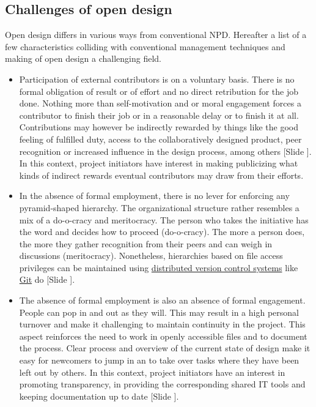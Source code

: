 \documentclass{article}
\newcounter{slide}
\begin{document}
\subsection{Challenges of open design}
\label{sec:challengesOD}
Open design differs in various ways from conventional NPD. Hereafter a list of a few characteristics colliding with conventional management techniques and making of open design a challenging field.
\begin{itemize}
  \item Participation of external contributors is on a voluntary basis. There is no formal obligation of result or of effort and no direct retribution for the job done. Nothing more than self-motivation and or moral engagement forces a contributor to finish their job or in a reasonable delay or to finish it at all. Contributions may however be indirectly rewarded by things like the good feeling of fulfilled duty, access to the collaboratively designed product, peer recognition or increased influence in the design process, among others {\color{blue}[Slide ]}. In this context, project initiators have interest in making publicizing what kinds of indirect rewards eventual contributors may draw from their efforts.
	\item In the absence of formal employment, there is no lever for enforcing any pyramid-shaped hierarchy. The organizational structure rather resembles a mix of a do-o-cracy and meritocracy. The person who takes the initiative has the word and decides how to proceed (do-o-cracy). The more a person does, the more they gather recognition from their peers and can weigh in discussions (meritocracy). Nonetheless, hierarchies based on file access privileges can be maintained using \href{https://en.wikipedia.org/wiki/Distributed_version_control}{distributed version control systems} like \href{https://git-scm.com/}{Git} do {\color{blue}[Slide ]}.
	\item The absence of formal employment is also an absence of formal engagement. People can pop in and out as they will. This may result in a high personal turnover and make it challenging to maintain continuity in the project. This aspect reinforces the need to work in openly accessible files and to document the process. Clear process and overview of the current state of design make it easy for newcomers to jump in an to take over tasks where they have been left out by others. In this context, project initiators have an interest in promoting transparency, in providing the corresponding shared IT tools and keeping documentation up to date {\color{blue}[Slide ]}.

\end{itemize}
\end{document}
